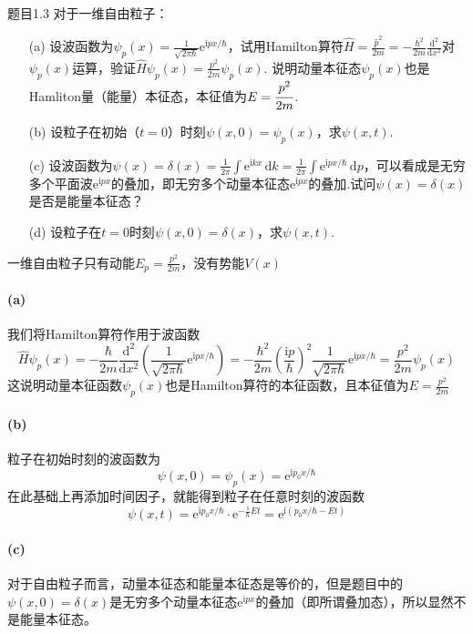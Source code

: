 \begin{question}{题目1.3}
    对于一维自由粒子：
    \begin{enumerate}
        \item[(a)] 设波函数为$\displaystyle \psi_p(x)=\frac{1}{\sqrt{2\pi\hbar}}\mathrm{e}^{\mathrm{i}px/\hbar}$，试用Hamilton算符$\displaystyle \hat{H}=\frac{\hat{p}^2}{2m}=-\frac{\hbar^2}{2m}\frac{\mathrm{d}^2}{\mathrm{d}x^2}$对$\psi_p(x)$运算，验证$\displaystyle \hat{H}\psi_p(x)=\frac{p^2}{2m}\psi_p(x)$. 说明动量本征态$\psi_p(x)$也是Hamliton量（能量）本征态，本征值为$\displaystyle E=\cfrac{p^2}{2m}$.
        \item[(b)] 设粒子在初始（$t=0$）时刻$\psi(x,0)=\psi_p(x)$，求$\psi(x,t)$.
        \item[(c)] 设波函数为$\displaystyle \psi(x)=\delta(x)=\frac{1}{2\pi}\int\mathrm{e}^{\mathrm{i}kx}\,\mathrm{d}k=\frac{1}{2\pi}\int\mathrm{e}^{\mathrm{i}px/\hbar}\,\mathrm{d}p$，可以看成是无穷多个平面波$\mathrm{e}^{\mathrm{i}px}$的叠加，即无穷多个动量本征态$\mathrm{e}^{\mathrm{i}px}$的叠加.试问$\psi(x)=\delta(x)$是否是能量本征态？
        \item[(d)] 设粒子在$t=0$时刻$\psi(x,0)=\delta(x)$，求$\psi(x,t)$.
    \end{enumerate}
\end{question}
\begin{solution}
    一维自由粒子只有动能$E_p=\frac{p^2}{2m}$，没有势能$V(x)$
    \paragraph{(a)} 我们将Hamilton算符作用于波函数
    $$
        \hat{H}\psi_p(x)
        =-\frac{\hbar}{2m}\frac{\mathrm{d}^2}{\mathrm{d}x^2}\left(\frac{1}{\sqrt{2\pi\hbar}}\mathrm{e}^{\mathrm{i}px/\hbar}\right)
        =-\frac{\hbar^2}{2m}\left(\frac{\mathrm{i}p}{\hbar}\right)^2 \frac{1}{\sqrt{2\pi\hbar}}\mathrm{e}^{\mathrm{i}px/\hbar}
        =\frac{p^2}{2m}\psi_p(x)
    $$
    这说明动量本征函数$\psi_p(x)$也是Hamilton算符的本征函数，且本征值为$E=\frac{p^2}{2m}$

    \paragraph{(b)}粒子在初始时刻的波函数为
    $$
        \psi(x,0)=\psi_p(x)=\mathrm{e}^{\mathrm{i}p_0x/\hbar}
    $$
    在此基础上再添加时间因子，就能得到粒子在任意时刻的波函数
    $$
        \psi(x,t)=\mathrm{e}^{\mathrm{i}p_0x/\hbar}\cdot\mathrm{e}^{-\frac{\mathrm{i}}{\hbar}Et}=\mathrm{e}^{\mathrm{i}(p_0x/\hbar-Et)}
    $$

    \paragraph{(c)} 对于自由粒子而言，动量本征态和能量本征态是等价的，但是题目中的$\psi(x, 0)=\delta(x)$是无穷多个动量本征态$\mathrm{e}^{\mathrm{i}px}$的叠加（即所谓叠加态），所以显然不是能量本征态。
\end{solution}

